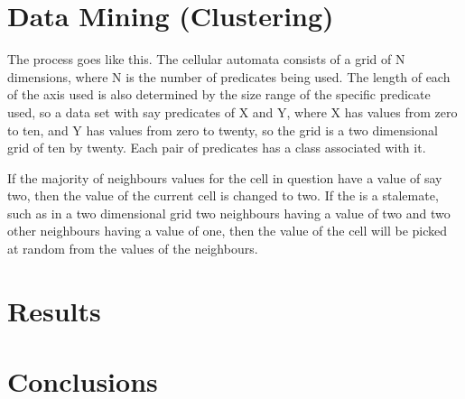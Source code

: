 \documentclass[11pt]{article}
\begin{document}
\section{Data Mining (Clustering)}
\label{sec-3}

  The process goes like this.  The cellular automata consists of a
  grid of N dimensions, where N is the number of predicates being
  used.  The length of each of the axis used is also determined by the
  size range of the specific predicate used, so a data set with say
  predicates of X and Y, where X has values from zero to ten, and Y
  has values from zero to twenty, so the grid is a two dimensional
  grid of ten by twenty.  Each pair of predicates has a class
  associated with it.  

  If the majority of neighbours values for the
  cell in question have a value of say two, then the value of the
  current cell is changed to two.  If the is a stalemate, such as in a
  two dimensional grid two neighbours having a value of two and two
  other neighbours having a value of one, then the value of the cell
  will be picked at random from the values of the neighbours.
\section{Results}
\label{sec-4}

  
\section{Conclusions}
\label{sec-5}

  




\end{document}
